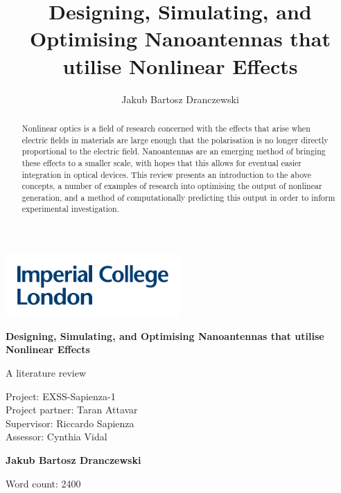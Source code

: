 \documentclass[12pt,a4paper]{article}
\author{Jakub Bartosz Dranczewski}
\title{Designing, Simulating, and Optimising Nanoantennas that utilise Nonlinear Effects}
\date{}
\begin{document}
\begin{titlepage}
	\vspace*{-0.65in}
	\hspace*{-.72in}
	\includegraphics[width=0.5\textwidth]{img/Imperial-logo.pdf}
	\begin{center}
		\vspace*{2cm}
		
		\Huge
		\textbf{Designing, Simulating, and Optimising Nanoantennas that utilise Nonlinear Effects}
		
		\Large
		A literature review
		
		\vspace{1.2cm}
		\large
		Project: EXSS-Sapienza-1\\
		Project partner: Taran Attavar\\
		Supervisor: Riccardo Sapienza\\
		Assessor: Cynthia Vidal
		
		\vspace{1.5cm}
		
		\textbf{Jakub Bartosz Dranczewski}
		
		\vfill
		
		\vspace{0.4cm}
		
		
		Word count: 2400 %
		
	\end{center}
\end{titlepage}

\begin{abstract}
Nonlinear optics is a field of research concerned with the effects that arise when electric fields in materials are large enough that the polarisation is no longer directly proportional to the electric field. Nanoantennas are an emerging method of bringing these effects to a smaller scale, with hopes that this allows for eventual easier integration in optical devices. This review presents an introduction to the above concepts, a number of examples of research into optimising the output of nonlinear generation, and a method of computationally predicting this output in order to inform experimental investigation.
\end{abstract}
\end{document}
